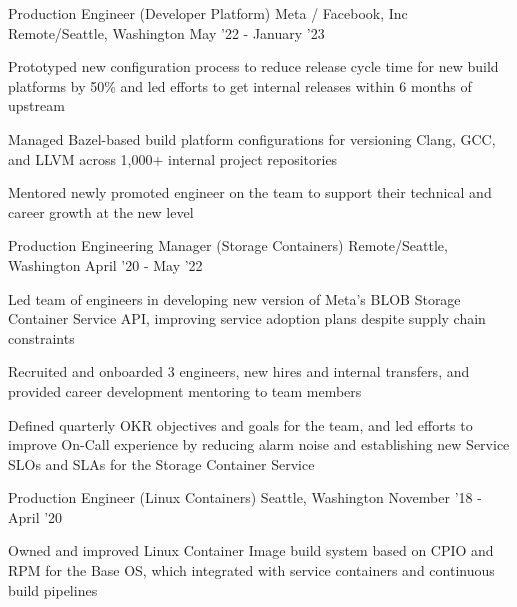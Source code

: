 \def\title{\color{solarized-cyan}Job\color{solarized-violet}(Log)}

\cvsection{\title{}{}}
\begin{cventries}
\cventry
	{Production Engineer \color{solarized-orange}(Developer Platform)} %
	{Meta / Facebook, Inc} %
    {Remote/Seattle, Washington} %
    {May '22 - January '23} %
    {
        \begin{cvitems}
		  \item Prototyped new configuration process to reduce release cycle time for new build platforms by 50\% and led efforts to get internal releases within 6 months of upstream
		  \item Managed Bazel-based build platform configurations for versioning Clang, GCC, and LLVM across 1,000+ internal project repositories
		  \item Mentored newly promoted engineer on the team to support their technical and career growth at the new level
        \end{cvitems}
    }
\vspace{0mm}
\cventry
	{Production Engineering Manager \color{solarized-orange}(Storage Containers)} %
    {} %
    {Remote/Seattle, Washington} %
    {April '20 - May '22} %
    {
        \begin{cvitems}
		\item Led team of engineers in developing new version of Meta's BLOB Storage Container Service API, improving service adoption plans despite supply chain constraints
		\item Recruited and onboarded 3 engineers, new hires and internal transfers, and provided career development mentoring to team members
		\item Defined quarterly OKR objectives and goals for the team, and led efforts to improve On-Call experience by reducing alarm noise and establishing new Service SLOs and SLAs for the Storage Container Service
        \end{cvitems}
    }
\vspace{2mm}
\cventry
	{Production Engineer \color{solarized-orange}(Linux Containers)} %
    {} %
    {Seattle, Washington} %
    {November '18 - April '20} %
    {
        \begin{cvitems}
		  \item Owned and improved Linux Container Image build system based on CPIO and RPM for the Base OS, which integrated with service containers and continuous build pipelines

\end{cvitems}}
\end{cventries}
